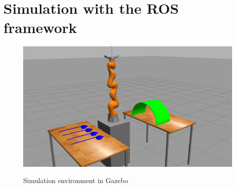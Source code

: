 \section{Simulation with the ROS framework}

\begin{center}
\begin{figure}[H]
\centering
\includegraphics[width=12cm]{images/gazebo-sim1.png}\\
\caption{Simulation environment in Gazebo}
\end{figure}
\end{center}